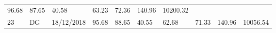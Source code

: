 \documentclass[
  11pt,
]{article}
\begin{document}
\begin{longtable}[]{@{}llllllllll@{}}
\begin{minipage}[t]{0.07\columnwidth}
96.68\strut
\end{minipage} & \begin{minipage}[t]{0.07\columnwidth}\raggedright
87.65\strut
\end{minipage} & \begin{minipage}[t]{0.07\columnwidth}\raggedright
40.58\strut
\end{minipage} & \begin{minipage}[t]{0.07\columnwidth}\raggedright
63.23\strut
\end{minipage} & \begin{minipage}[t]{0.07\columnwidth}\raggedright
72.36\strut
\end{minipage} & \begin{minipage}[t]{0.08\columnwidth}\raggedright
140.96\strut
\end{minipage} & \begin{minipage}[t]{0.09\columnwidth}\raggedright
10200.32\strut
\end{minipage}\tabularnewline
\begin{minipage}[t]{0.05\columnwidth}\raggedright
23\strut
\end{minipage} & \begin{minipage}[t]{0.07\columnwidth}\raggedright
DG\strut
\end{minipage} & \begin{minipage}[t]{0.11\columnwidth}\raggedright
18/12/2018\strut
\end{minipage} & \begin{minipage}[t]{0.07\columnwidth}\raggedright
95.68\strut
\end{minipage} & \begin{minipage}[t]{0.07\columnwidth}\raggedright
88.65\strut
\end{minipage} & \begin{minipage}[t]{0.07\columnwidth}\raggedright
40.55\strut
\end{minipage} & \begin{minipage}[t]{0.07\columnwidth}\raggedright
62.68\strut
\end{minipage} & \begin{minipage}[t]{0.07\columnwidth}\raggedright
71.33\strut
\end{minipage} & \begin{minipage}[t]{0.08\columnwidth}\raggedright
140.96\strut
\end{minipage} & \begin{minipage}[t]{0.09\columnwidth}\raggedright
10056.54\strut
\end{minipage}\tabularnewline

\end{longtable}
\end{document}
